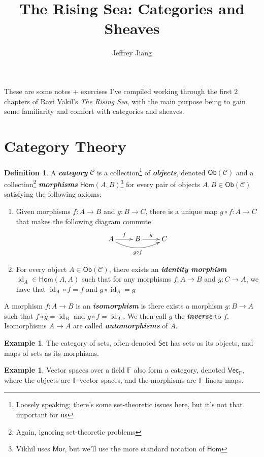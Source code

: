 \documentclass[psamsfonts]{amsart}
\theoremstyle{definition}
\newtheorem{defn}[thm]{Definition}
\newtheorem{exmp}[thm]{Example}
\theoremstyle{remark}
\renewcommand{\hom}{\mathsf{Hom}}
\newcommand{\ib}[1]{\textbf{\textit{#1}}}
\newcommand{\F}{\mathbb{F}}
\DeclareMathOperator{\id}{id}
\begin{document}
\author{Jeffrey Jiang}
\title{The Rising Sea: Categories and Sheaves}
\maketitle

These are some notes + exercises I've compiled working through the first $2$ chapters of Ravi Vakil's \emph{The Rising Sea}, with the main purpose being to gain some familiarity and comfort with categories and sheaves.	
%
\section{Category Theory}
%
\begin{defn}
A \ib{category} $\mathscr{C}$ is a collection\footnote{Loosely speaking; there's some set-theoretic issues here, but it's not that important for us} of \ib{objects}, denoted $\mathsf{Ob}(\mathscr{C})$ and a collection\footnote{Again, ignoring set-theoretic problems} \ib{morphisms} $\hom(A,B)$\footnote{Vikhil uses $\mathsf{Mor}$, but we'll use the more standard notation of $\hom$} for every pair of objects $A,B \in \mathsf{Ob}(\mathscr{C})$ satisfying the following axioms:
\begin{enumerate}
\item Given morphisms $f: A \to B$ and $g: B \to C$, there is a unique map $g \circ f: A \to C$ that makes the following diagram commute
$$\xymatrix{
A \ar@/_1pc/[rr]_{g \circ f}\ar[r]^f & B \ar[r]^g & C
}$$
\item For every object $A \in \mathsf{Ob}(\mathscr{C})$, there exists an \ib{identity morphism} $\id_A \in \hom(A,A)$ such that for any morphisms $f: A \to B$ and $g: C \to A$, we have that $\id_A \circ f = f$ and $g \circ \id_A = g$
\end{enumerate}
A morphism $f: A \to B$ is an \ib{isomorphism} is there exists a morphism $g: B \to A$ such that $f \circ g = \id_B$ and $g \circ f = \id_A$. We then call $g$ the \ib{inverse} to $f$. Isomorphisms $A \to A$ are called \ib{automorphisms} of $A$.
\end{defn}
%
\begin{exmp}
The category of sets, often denoted $\mathsf{Set}$ has sets as its objects, and maps of sets as its morphisms.
\end{exmp}
%
\begin{exmp}
Vector spaces over a field $\F$ also form a category, denoted $\mathsf{Vec}_\F$, where the objects are $\F$-vector spaces, and the morphisms are $\F$-linear maps.
\end{exmp}
\end{document}
